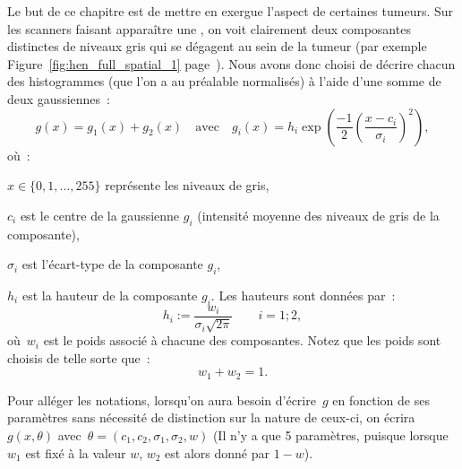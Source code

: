 \documentclass[main.tex]{subfiles}
\begin{document}
Le but de ce chapitre est de mettre en exergue l'aspect \heterogene de certaines tumeurs. Sur les scanners %
faisant apparaître une \hetero, 
on voit clairement deux composantes distinctes de niveaux gris qui se dégagent au sein de la tumeur (\cf par exemple Figure~\ref{fig:hen_full_spatial_1} page~\pageref{fig:hen_full_spatial_1}). Nous avons donc choisi de décrire chacun des histogrammes (que l'on a au préalable normalisés) à l'aide d'une somme de deux gaussiennes~:
\begin{equation}
\label{eq:decomp_gaussienne}
g(x) = g_1(x)+g_2(x) \quad \textrm{avec} \quad g_i(x) = h_i\exp \left(\frac{-1}{2} \left( \dfrac{x-c_i}{\sigma_i}\right)^2  \right),
\end{equation}
où~:
\begin{myitemize}
\item $x\in\{ 0,1, ..., 255\}$ représente les niveaux de gris,
\item $c_i$ est le centre de la gaussienne $g_i$ (\ie intensité moyenne des niveaux de gris de la composante),
\item $\sigma_i$ est l'écart-type de la composante $g_i$,
\item $h_i$ est la hauteur de la composante $g_i$. Les hauteurs sont données par~:
\begin{equation}
\label{eq:hauteur_gaussienne}
h_i := \dfrac{w_i}{\sigma_i \sqrt{2\pi}} \qquad i=1;2,
\end{equation}
où~$w_i$ est le poids associé à chacune des composantes. Notez que les poids sont choisis de telle sorte que~:
\begin{equation}
w_1+w_2=1.
\end{equation}
\end{myitemize}

Pour alléger les notations, lorsqu'on aura besoin d'écrire~$g$ en fonction de ses paramètres sans nécessité de distinction sur la nature de ceux-ci, on écrira~$g(x,\theta)$ avec~$\theta =( c_1,c_2,\sigma_1,\sigma_2,w  )$ (Il n'y a que 5 paramètres, puisque lorsque $w_1$ est fixé à la valeur $w$, $w_2$ est alors donné par $1-w$).
\end{document}
